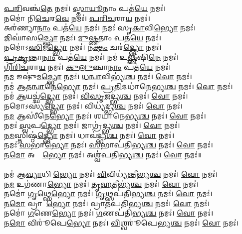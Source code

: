 \ul{𑌪}\ul{𑌰𑌿}𑌵𑌞𑍍𑌚॑\ul{𑌤𑍇} 𑌨𑌮𑌃॑। \ul{𑌸𑍍𑌤𑌾}\ul{𑌯𑍂}𑌨𑌾𑌂 𑌪𑌤॑\ul{𑌯𑍇} 𑌨𑌮𑌃॑। \\
𑌨𑌮𑍋॑ 𑌨𑌿\ul{𑌚𑍇}𑌰\ul{𑌵𑍇} 𑌨𑌮𑌃॑। \ul{𑌪}\ul{𑌰𑌿}\ul{𑌚}𑌰𑌾\ul{𑌯} 𑌨𑌮𑌃॑। \\
𑌅𑌰॑𑌣𑍍𑌯𑌾\ul{𑌨𑌾𑌂} 𑌪𑌤॑\ul{𑌯𑍇} 𑌨𑌮𑌃॑। 𑌨𑌮𑌃॑ 𑌸𑍃\ul{𑌕𑌾}𑌵𑌿\ul{𑌭𑍍𑌯𑍋} 𑌨𑌮𑌃॑। \\
𑌜𑌿𑌘𑌾॑𑌸\ul{𑌦𑍍𑌭𑍍𑌯𑍋} 𑌨𑌮𑌃॑। \ul{𑌮𑍁}\ul{𑌷𑍍𑌣}𑌤𑌾𑌂 𑌪𑌤॑\ul{𑌯𑍇} 𑌨𑌮𑌃॑। \\
𑌨𑌮𑍋॑𑌽\ul{𑌸𑌿}𑌮\ul{𑌦𑍍𑌭𑍍𑌯𑍋} 𑌨𑌮𑌃॑। 𑌨\ul{𑌕𑍍𑌤𑌂} 𑌚𑌰॑\ul{𑌦𑍍𑌭𑍍𑌯𑍋} 𑌨𑌮𑌃॑। \\
\ul{𑌪𑍍𑌰}\ul{𑌕𑍃}𑌨𑍍𑌤𑌾\ul{𑌨𑌾𑌂} 𑌪𑌤॑\ul{𑌯𑍇} 𑌨𑌮𑌃॑। 𑌨𑌮॑ 𑌉\ul{𑌷𑍍𑌣𑍀}𑌷𑌿\ul{𑌨𑍇} 𑌨𑌮𑌃॑। \\
\ul{𑌗𑌿}\ul{𑌰𑌿}\ul{𑌚}𑌰𑌾\ul{𑌯} 𑌨𑌮𑌃॑। \ul{𑌕𑍁}\ul{𑌲𑍁}𑌞𑍍𑌚𑌾\ul{𑌨𑌾𑌂} 𑌪𑌤॑\ul{𑌯𑍇}  𑌨𑌮𑌃॑। \\
𑌨\ul{𑌮} 𑌇𑌷𑍁॑𑌮\ul{𑌦𑍍𑌭𑍍𑌯𑍋}  𑌨𑌮𑌃॑। \ul{𑌧}\ul{𑌨𑍍𑌵𑌾}𑌵𑌿𑌭𑍍𑌯॑\ul{𑌶𑍍𑌚}  𑌨𑌮𑌃॑। \ul{𑌵𑍋}  𑌨𑌮𑌃॑। \\
𑌨𑌮॑ 𑌆𑌤\ul{𑌨𑍍𑌵𑌾}𑌨𑍇\ul{𑌭𑍍𑌯𑍋} 𑌨𑌮𑌃॑। \ul{𑌪𑍍𑌰}\ul{𑌤𑌿}𑌦𑌧𑌾॑𑌨𑍇𑌭𑍍𑌯\ul{𑌶𑍍𑌚}  𑌨𑌮𑌃॑। \ul{𑌵𑍋} 𑌨𑌮𑌃॑।\\
𑌨𑌮॑ \ul{𑌆}𑌯𑌚𑍍𑌛॑\ul{𑌦𑍍𑌭𑍍𑌯𑍋}  𑌨𑌮𑌃॑।  \ul{𑌵𑌿}\ul{𑌸𑍃}𑌜𑌦𑍍𑌭𑍍𑌯॑\ul{𑌶𑍍𑌚}  𑌨𑌮𑌃॑।  \ul{𑌵𑍋} 𑌨𑌮𑌃॑।\\
𑌨𑌮𑍋𑌽𑌸𑍍𑌯॑\ul{𑌦𑍍𑌭𑍍𑌯𑍋}  𑌨𑌮𑌃॑। 𑌵𑌿𑌧𑍍𑌯॑𑌦𑍍𑌭𑍍𑌯\ul{𑌶𑍍𑌚}  𑌨𑌮𑌃॑।  \ul{𑌵𑍋} 𑌨𑌮𑌃॑।\\
𑌨\ul{𑌮} 𑌆𑌸𑍀॑𑌨𑍇\ul{𑌭𑍍𑌯𑍋}  𑌨𑌮𑌃॑। 𑌶𑌯𑌾॑𑌨𑍇𑌭𑍍𑌯\ul{𑌶𑍍𑌚}  𑌨𑌮𑌃॑। \ul{𑌵𑍋} 𑌨𑌮𑌃॑।\\
𑌨𑌮𑌃॑ \ul{𑌸𑍍𑌵}𑌪\ul{𑌦𑍍𑌭𑍍𑌯𑍋}  𑌨𑌮𑌃॑। 𑌜𑌾𑌗𑍍𑌰॑𑌦𑍍𑌭𑍍𑌯\ul{𑌶𑍍𑌚}  𑌨𑌮𑌃॑।  \ul{𑌵𑍋} 𑌨𑌮𑌃॑।\\
𑌨\ul{𑌮}𑌸𑍍𑌤𑌿𑌷𑍍𑌠॑\ul{𑌦𑍍𑌭𑍍𑌯𑍋}  𑌨𑌮𑌃॑। 𑌧𑌾𑌵॑𑌦𑍍𑌭𑍍𑌯\ul{𑌶𑍍𑌚}  𑌨𑌮𑌃॑।  \ul{𑌵𑍋} 𑌨𑌮𑌃॑।\\
𑌨𑌮𑌃॑ \ul{𑌸}𑌭𑌾\ul{𑌭𑍍𑌯𑍋}  𑌨𑌮𑌃॑। \ul{𑌸}𑌭𑌾𑌪॑𑌤𑌿𑌭𑍍𑌯\ul{𑌶𑍍𑌚} 𑌨𑌮𑌃॑। \ul{𑌵𑍋} 𑌨𑌮𑌃॑।\\
𑌨\ul{𑌮𑍋} 𑌅𑌶𑍍𑌵𑍇᳚\ul{𑌭𑍍𑌯𑍋}  𑌨𑌮𑌃॑। 𑌅𑌶𑍍𑌵॑𑌪𑌤𑌿𑌭𑍍𑌯\ul{𑌶𑍍𑌚}  𑌨𑌮𑌃॑। \ul{𑌵𑍋} 𑌨𑌮𑌃॑॥\\
\\
𑌨𑌮॑ 𑌆\ul{𑌵𑍍𑌯𑌾}𑌧𑌿𑌨𑍀᳚\ul{𑌭𑍍𑌯𑍋}  𑌨𑌮𑌃॑। \ul{𑌵𑌿}𑌵𑌿𑌧𑍍𑌯॑𑌨𑍍𑌤𑍀𑌭𑍍𑌯\ul{𑌶𑍍𑌚}  𑌨𑌮𑌃॑।  \ul{𑌵𑍋} 𑌨𑌮𑌃॑। \\
𑌨\ul{𑌮} 𑌉𑌗॑𑌣𑌾\ul{𑌭𑍍𑌯𑍋} 𑌨𑌮𑌃॑। \ul{𑌤𑍃}\ul{}\ul{𑌹}𑌤𑍀𑌭𑍍𑌯॑\ul{𑌶𑍍𑌚} 𑌨𑌮𑌃॑। \ul{𑌵𑍋} 𑌨𑌮𑌃॑। \\
𑌨𑌮𑍋॑ \ul{𑌗𑍃}𑌥𑍍𑌸𑍇\ul{𑌭𑍍𑌯𑍋} 𑌨𑌮𑌃॑। \ul{𑌗𑍃}𑌥𑍍𑌸𑌪॑𑌤𑌿𑌭𑍍𑌯\ul{𑌶𑍍𑌚} 𑌨𑌮𑌃॑। \ul{𑌵𑍋} 𑌨𑌮𑌃॑। \\
𑌨\ul{𑌮𑍋} 𑌵𑍍𑌰𑌾𑌤𑍇᳚\ul{𑌭𑍍𑌯𑍋} 𑌨𑌮𑌃॑। 𑌵𑍍𑌰𑌾𑌤॑𑌪𑌤𑌿𑌭𑍍𑌯\ul{𑌶𑍍𑌚} 𑌨𑌮𑌃॑। \ul{𑌵𑍋} 𑌨𑌮𑌃॑। \\
𑌨𑌮𑍋॑ \ul{𑌗}𑌣𑍇\ul{𑌭𑍍𑌯𑍋} 𑌨𑌮𑌃॑। \ul{𑌗}𑌣𑌪॑𑌤𑌿𑌭𑍍𑌯\ul{𑌶𑍍𑌚} 𑌨𑌮𑌃॑। \ul{𑌵𑍋} 𑌨𑌮𑌃॑।\\
𑌨\ul{𑌮𑍋} 𑌵𑌿𑌰𑍂॑𑌪𑍇\ul{𑌭𑍍𑌯𑍋} 𑌨𑌮𑌃॑। \ul{𑌵𑌿}𑌶𑍍𑌵𑌰𑍂॑𑌪𑍇𑌭𑍍𑌯\ul{𑌶𑍍𑌚} 𑌨𑌮𑌃॑। \ul{𑌵𑍋} 𑌨𑌮𑌃॑। \\
